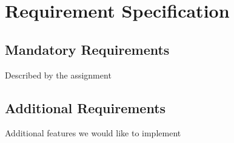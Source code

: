 \chapter{Requirement Specification}
\section{Mandatory Requirements}
Described by the assignment
\section{Additional Requirements}
Additional features we would like to implement